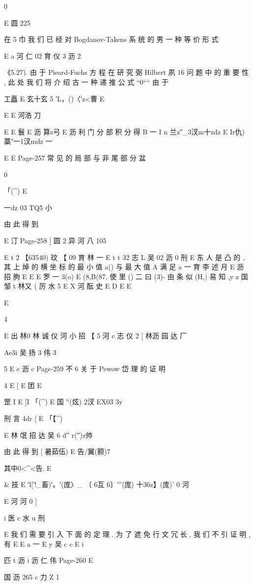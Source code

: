 {{{{{{{{{{{{{{{0

E 圆 225

在 5 巾 我 们 已 经 对 Bogdanov-Takens 系 统 的 男 一 种 等 价 形 式

E a 河 仁 02 育 仪 3 沥 2

《5.27). 由 于 Pieard-Fuchs 方 程 在 研 究 弼 Hilbert 夙 16 问 题 中 的 重
要 性 , 此 处 我 们 将 介 绍 古 一 种 递 推 公 式 “0““ 由 于

工矗
E 玄十玄 5 ′L，()〈′z<曹
E

E
E 河浩 刀

E
E 鬟 E 沥 算z弓 E 沥
利 门 分 部 积 分 得
B 一 I n 兰z″_3汊m十zdz E Ir仇)藁"一1汊mdz 一

E E
Page-257
常 见 的 局 部 与 非 尾 部 分 盆

0

「(^) E

一dz 03
TQ5 小

由 此 得 到

E 汀
Page-258
[ 圆 2 异 河 八 105

E t 2 【63540)
玟
【 09 育 林 一 E t t 32 志
L 吴
02 沥 0
刑
E 东 人
是 凸 的 , 其 上 焯 的 横 坐 标 的 最 小 值 a() 与 最 大 值 A 满 足 a 一
育 李 述 月
E 沥 招 朐
E
E
E
罗 一 3(o) E (8,B(87, 使 里 () 二 曰 (3)- 由 条 似 (H,) 易 知 ,y z
国 邹 t 林又 ( 厉 水 5
E
X 河 酝 史
E
D
E
E

E

4

E 出 林0 林 诚 仪 河 小 招
【 5 河 c 志 仪 2
[ 林沥
园 达 厂

Ae3i 吴 扬 3 伟 3

5 E c 沥 c
Page-259
不 6 关 于 Pewow 岱 理 的 证 明

4
E [ E
团 E

罡 I E [I
「(^) E 国 ′`(炫) 2汊 EX03 3y

刑 言 4dr [
E 「【^)

E 林 氓 招
达 吴 6 d′′ r(″)z帅

由 此 得 到
[ 暑茹伍) E 告/翼(颢)7

其中0<^<告. E

& 技 E
′l[′!_畜)′。′(庞〉_ 〔 6互 6〕′”(庞) 十36z】(庞)' 0 河

E 河 河 0 ]

i
医 c 水
u 刑

E
我 们 需 要 引 入 下 面 的 定 理 . 为 了 遮 免 行 文 冗 长 , 我 们 不 引 证 明 , 有
E
E a 一
E y 吴
c c
E
i

匹
t 沥 i 沥 仁 伟
Page-260
E

国 沥 265
c 力 Z 1

}}}}}}}}}}}}}}}
